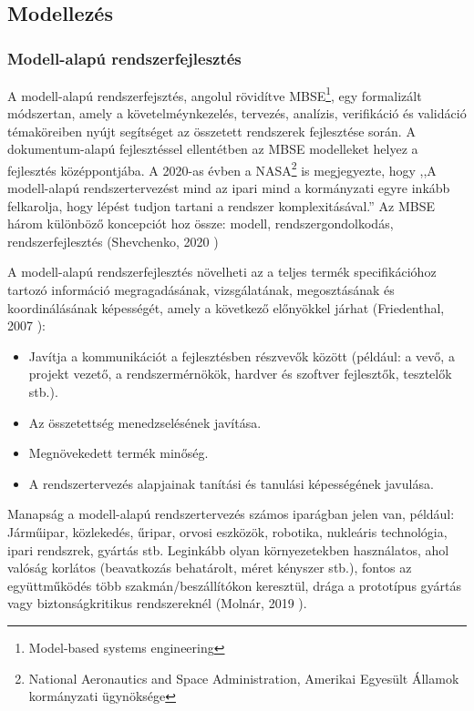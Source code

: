 \chapter{\hatterismeret}\label{chap:hatter}

\section{Modellezés}
\subsection{Modell-alapú rendszerfejlesztés}
A modell-alapú rendszerfejsztés, angolul rövidítve MBSE\footnote{Model-based systems engineering}, egy formalizált módszertan, amely a követelméynkezelés, tervezés, analízis, verifikáció és validáció témaköreiben nyújt segítséget az összetett rendszerek fejlesztése során.
A dokumentum-alapú fejlesztéssel ellentétben az MBSE modelleket helyez a fejlesztés középpontjába.
A 2020-as évben a NASA\footnote{National Aeronautics and Space Administration, Amerikai Egyesült Államok kormányzati ügynöksége} is megjegyezte, hogy ,,A modell-alapú rendszertervezést mind az ipari mind a kormányzati egyre inkább felkarolja, hogy lépést tudjon tartani a rendszer komplexitásával.''\cite{Nasa2020}
Az MBSE három különböző koncepciót hoz össze: modell, rendszergondolkodás, rendszerfejlesztés (Shevchenko, 2020 \cite{shevchenko_2020})

A modell-alapú rendszerfejlesztés növelheti az a teljes termék specifikációhoz tartozó információ megragadásának, vizsgálatának, megosztásának és koordinálásának képességét, amely a következő előnyökkel járhat (Friedenthal, 2007 \cite{friedenthal2007incose}):
\begin{itemize}
    \item Javítja a kommunikációt a fejlesztésben részvevők között (például: a vevő, a projekt vezető, a rendszermérnökök, hardver és szoftver fejlesztők, tesztelők stb.).
    \item Az összetettség menedzselésének javítása.
    \item Megnövekedett termék minőség.
    \item A rendszertervezés alapjainak tanítási és tanulási képességének javulása.
\end{itemize}

Manapság a modell-alapú rendszertervezés számos iparágban jelen van, például: Járműipar, közlekedés, űripar, orvosi eszközök, robotika, nukleáris technológia, ipari rendszrek, gyártás stb.
Leginkább olyan környezetekben használatos, ahol valóság korlátos (beavatkozás behatárolt, méret kényszer stb.), 
fontos az együttműködés több szakmán/beszállítókon keresztül, 
drága a prototípus gyártás vagy biztonságkritikus rendszereknél (Molnár, 2019 \cite{rete0}).

